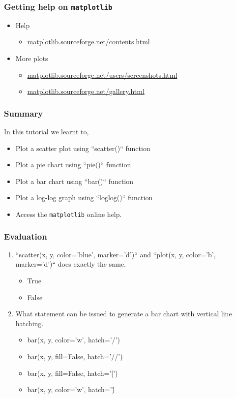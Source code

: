 \documentclass[presentation]{beamer}
\begin{document}
\begin{frame}
\frametitle{Getting help on \verb~matplotlib~}
\label{sec-18}


\begin{itemize}
\item Help
\begin{itemize}
\item \hyperref[matplotlib.sourceforge.net--contents.html]{matplotlib.sourceforge.net/contents.html}
\end{itemize}
\item More plots
\begin{itemize}
\item \hyperref[matplotlib.sourceforge.net--users--screenshots.html]{matplotlib.sourceforge.net/users/screenshots.html}
\item \hyperref[matplotlib.sourceforge.net--gallery.html]{matplotlib.sourceforge.net/gallery.html}
\end{itemize}
\end{itemize}
\end{frame}
\begin{frame}
\frametitle{Summary}
\label{sec-19}

  In this tutorial we learnt to,
 

\begin{itemize}
\item Plot a scatter plot using ``scatter()`` function
\item Plot a pie chart using ``pie()`` function
\item Plot a bar chart using ``bar()`` function
\item Plot a log-log graph using ``loglog()`` function
\item Access the \verb~matplotlib~ online help.
\end{itemize}
\end{frame}
\begin{frame}
\frametitle{Evaluation}
\label{sec-20}


\begin{enumerate}
\item ``scatter(x, y, color='blue', marker='d')`` and ``plot(x, y,
     color='b', marker='d')`` does exactly the same.
\begin{itemize}
\item True
\item False
\end{itemize}
\item What statement can be issued to generate a bar chart with vertical
     line hatching.
\begin{itemize}
\item bar(x, y, color='w', hatch='/')
\item bar(x, y, fill=False, hatch='//')
\item bar(x, y, fill=False, hatch='|')
\item bar(x, y, color='w', hatch='\')
\end{itemize}
\end{enumerate}
\end{frame}
\end{document}

